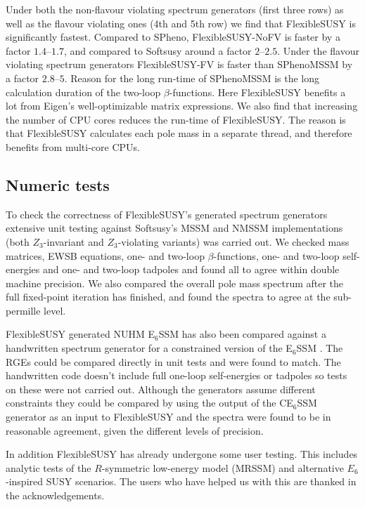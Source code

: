 \documentclass[final,3p,11pt,pdflatex]{elsarticle}
\makeatletter
\newcommand{\fs}{FlexibleSUSY\@\xspace}
\newcommand{\ESSM}{E$_6$SSM\@\xspace}
\makeatother
\begin{document}
Under both the non-flavour violating spectrum generators (first three
rows) as well as the flavour violating ones (4th and 5th row) we find
that \fs is significantly fastest.  Compared to SPheno,
FlexibleSUSY-NoFV is faster by a factor $1.4$--$1.7$, and compared to
Softsusy around a factor $2$--$2.5$.  Under the flavour violating
spectrum generators FlexibleSUSY-FV is faster than SPhenoMSSM by a
factor $2.8$--$5$.  Reason for the long run-time of SPhenoMSSM is the
long calculation duration of the two-loop $\beta$-functions.  Here \fs
benefits a lot from Eigen's well-optimizable matrix expressions.  We
also find that increasing the number of CPU cores reduces the run-time
of \fs.  The reason is that \fs calculates each pole mass in a
separate thread, and therefore benefits from multi-core CPUs.

\subsection{Numeric tests}

To check the correctness of \fs's generated spectrum generators
extensive unit testing against Softsusy's MSSM and NMSSM
implementations (both $Z_3$-invariant and $Z_3$-violating variants)
was carried out. We checked mass matrices, EWSB equations, one- and two-loop
$\beta$-functions, one- and two-loop self-energies and one- and
two-loop tadpoles and found all to agree within double machine
precision.  We also compared the overall pole mass spectrum after the
full fixed-point iteration has finished, and found the spectra to
agree at the sub-permille level.  

\fs generated NUHM \ESSM has also been compared against a handwritten
spectrum generator for a constrained version of the \ESSM
\cite{Athron:2009ue, Athron:2009bs, Athron:2011wu, Athron:2012sq,
  Athron:2012pw, Athron:2013ipa}.  The RGEs could be compared directly
in unit tests and were found to match.  The handwritten code doesn't
include full one-loop self-energies or tadpoles so tests on these were
not carried out.  Although the generators assume different constraints
they could be compared by using the output of the CE$_6$SSM generator
as an input to \fs and the spectra were found to be in reasonable
agreement, given the different levels of precision.

In addition \fs has already undergone some user testing. This includes
analytic tests of the $R$-symmetric low-energy model (MRSSM) and
alternative $E_6$-inspired SUSY scenarios.  The users who have helped us
with this are thanked in the acknowledgements.
\end{document}
